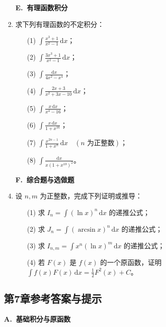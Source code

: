 \documentclass[fontset=fandol]{ctexart}
\newcommand{\dd}{\mathrm{d}}
\begin{document}
\begin{enumerate}
\item[]\textbf{E.\ 有理函数积分}
\setcounter{enumi}{0}
\item 求下列有理函数的不定积分：
\begin{enumerate}
\item[(1)] $\displaystyle \int \frac{x^3+1}{x^2-1}\,\dd x$；
\item[(2)] $\displaystyle \int \frac{3x^3+1}{x^2-1}\,\dd x$；
\item[(3)] $\displaystyle \int \frac{\dd x}{4x^2-x^4}$；
\item[(4)] $\displaystyle \int \frac{2x+3}{x^2+3x-10}\,\dd x$；
\item[(5)] $\displaystyle \int \frac{x\,\dd x}{x^4-16}$；
\item[(6)] $\displaystyle \int \frac{x\,\dd x}{1+x^{16}}$；
\item[(7)] $\displaystyle \int \frac{x^{2n-1}}{1+x^n}\,\dd x\quad(n\text{ 为正整数})$；
\item[(8)] $\displaystyle \int \frac{\dd x}{x(1+x^{10})^2}$。
\end{enumerate}

\item[]\textbf{F.\ 综合题与选做题}
\setcounter{enumi}{0}
\item 设 $n,m$ 为正整数，完成下列证明或推导：
\begin{enumerate}
\item[(1)] 求 $\displaystyle I_n=\int(\ln x)^n\,\dd x$ 的递推公式；
\item[(2)] 求 $\displaystyle J_n=\int(\arcsin x)^n\,\dd x$ 的递推公式；
\item[(3)] 求 $\displaystyle I_{n,m}=\int x^n(\ln x)^m\,\dd x$ 的递推公式；
\item[(4)] 若 $F(x)$ 是 $f(x)$ 的一个原函数，证明 $\displaystyle \int f(x)F(x)\,\dd x=\frac12F^2(x)+C$。
\end{enumerate}
\end{enumerate}

\subsection*{第7章参考答案与提示}

\textbf{A.\ 基础积分与原函数}
\end{document}
